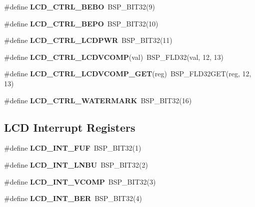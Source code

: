 \begin{DoxyCompactItemize}
\#define {\bfseries L\+C\+D\+\_\+\+C\+T\+R\+L\+\_\+\+B\+E\+BO}~B\+S\+P\+\_\+\+B\+I\+T32(9)
\item 
\mbox{\label{group__lpc__lcd_gaa996e4b7504f116316bb686d1134aa82}} 
\#define {\bfseries L\+C\+D\+\_\+\+C\+T\+R\+L\+\_\+\+B\+E\+PO}~B\+S\+P\+\_\+\+B\+I\+T32(10)
\item 
\mbox{\label{group__lpc__lcd_ga9ac725cb9066bb52dccae31dba156a04}} 
\#define {\bfseries L\+C\+D\+\_\+\+C\+T\+R\+L\+\_\+\+L\+C\+D\+P\+WR}~B\+S\+P\+\_\+\+B\+I\+T32(11)
\item 
\mbox{\label{group__lpc__lcd_gaab5bbe6e9d238860be74e46dae918332}} 
\#define {\bfseries L\+C\+D\+\_\+\+C\+T\+R\+L\+\_\+\+L\+C\+D\+V\+C\+O\+MP}(val)~B\+S\+P\+\_\+\+F\+L\+D32(val, 12, 13)
\item 
\mbox{\label{group__lpc__lcd_ga63d8106d7aa9dcb9d3d01eb38a5cc544}} 
\#define {\bfseries L\+C\+D\+\_\+\+C\+T\+R\+L\+\_\+\+L\+C\+D\+V\+C\+O\+M\+P\+\_\+\+G\+ET}(reg)~B\+S\+P\+\_\+\+F\+L\+D32\+G\+ET(reg, 12, 13)
\item 
\mbox{\label{group__lpc__lcd_ga04e7c5ee372a6ae92b28fade4f667a87}} 
\#define {\bfseries L\+C\+D\+\_\+\+C\+T\+R\+L\+\_\+\+W\+A\+T\+E\+R\+M\+A\+RK}~B\+S\+P\+\_\+\+B\+I\+T32(16)
\end{DoxyCompactItemize}
\subsection*{L\+CD Interrupt Registers}
\begin{DoxyCompactItemize}
\item 
\mbox{\label{group__lpc__lcd_ga92fbb356a1c6d0aec0eb3b1672f57b7a}} 
\#define {\bfseries L\+C\+D\+\_\+\+I\+N\+T\+\_\+\+F\+UF}~B\+S\+P\+\_\+\+B\+I\+T32(1)
\item 
\mbox{\label{group__lpc__lcd_ga96b4aa33cc193669738e6b2dae2f2df3}} 
\#define {\bfseries L\+C\+D\+\_\+\+I\+N\+T\+\_\+\+L\+N\+BU}~B\+S\+P\+\_\+\+B\+I\+T32(2)
\item 
\mbox{\label{group__lpc__lcd_ga83a5d4ab62d7fc4cf577fa892a92a3cb}} 
\#define {\bfseries L\+C\+D\+\_\+\+I\+N\+T\+\_\+\+V\+C\+O\+MP}~B\+S\+P\+\_\+\+B\+I\+T32(3)
\item 
\mbox{\label{group__lpc__lcd_ga31927da438b1a8036354d78c555e523f}} 
\#define {\bfseries L\+C\+D\+\_\+\+I\+N\+T\+\_\+\+B\+ER}~B\+S\+P\+\_\+\+B\+I\+T32(4)
\end{DoxyCompactItemize}
